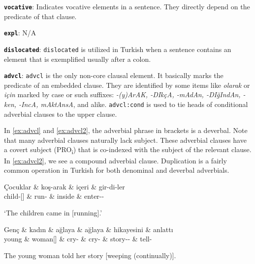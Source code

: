 \documentclass[11pt,a4paper]{article}
\begin{document}
\textbf{\texttt{vocative}}:
Indicates vocative elements in a sentence. They directly depend on the predicate of that clause.

\textbf{\texttt{expl}}:
N/A

\textbf{\texttt{dislocated}}:
\texttt{dislocated} is utilized in Turkish when a sentence contains an element that is exemplified usually after a colon.

\textbf{\texttt{advcl}}:
\texttt{advcl} is the only non-core clausal element. It basically marks the predicate of an embedded clause. They are identified by some items like \textit{olarak} or \textit{için} marked by case or such suffixes: \textit{-(y)ArAK, -DIkçA, -mAdAn, -DIğIndAn, -ken, -IncA, mAktAnsA}, and alike. \texttt{advcl:cond} is used to tie heads of conditional adverbial clauses to the upper clause.

In \autoref{ex:advcl} and \autoref{ex:advcl2}, the adverbial phrase in brackets is a deverbal. Note that many adverbial clauses naturally lack subject. These adverbial clauses have a covert subject (PRO\textsubscript{i}) that is co-indexed with the subject of the relevant clause. In \autoref{ex:advcl2}, we see a compound adverbial clause. Duplication is a fairly common operation in Turkish for both denominal and deverbal adverbials.

\begin{exe}
\ex \label{ex:advcl}
\begin{dependency}
\begin{deptext}[column sep=0.3cm]
Çocuklar \& koş-arak \& içeri \& gir-di-ler \\
child-\Pl{}[\Nom] \& run-\Adv{} \& inside \& enter-\Pst{}-\Tpl{}\\
\end{deptext}
\end{dependency}
\glt `The children came in [running].'

\ex \label{ex:advcl2}
\begin{dependency}
\begin{deptext}[column sep=0.3cm]
Genç \& kadın \& ağlaya \& ağlaya \& hikayesini \& anlattı \\
young \& woman[\Nom] \& cry-\Adv{} \& cry-\Adv{} \& story-\Tsg{}-\Acc{} \& tell-\Pst{} \\
\end{deptext}
\end{dependency}
\glt The young woman told her story [weeping (continually)].
\end{exe}
\end{document}
